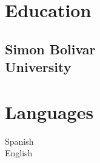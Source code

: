 \documentclass[]{plushcv}
\begin{document}
\begin{minipage}[t]{0.25\textwidth}
\sectionsep


\section{Education} 
\subsection{Simon Bolivar \\ University}
\sectionsep


\section{Languages}
Spanish \\
\sectionsep
{}
English \\
\sectionsep




\end{minipage}
\end{document}
